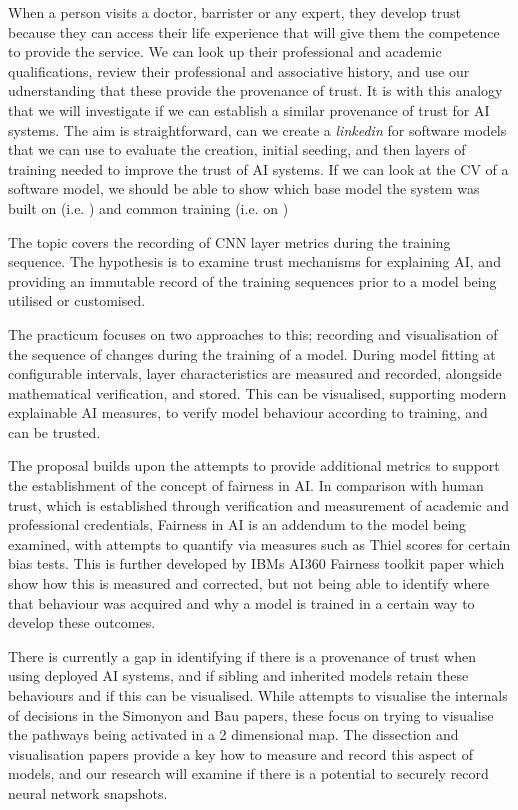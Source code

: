 When a person visits a doctor, barrister or any expert, they develop trust because they can access their life experience that will give them the competence to provide the service. We can look up their professional and academic qualifications, review their professional and associative history, and use our udnerstanding that these provide the provenance of trust. It is with this analogy that we will investigate if we can establish a similar provenance of trust for AI systems. The aim is straightforward, can we create a \textit{linkedin} for software models that we can use to evaluate the creation, initial seeding, and then layers of training needed to improve the trust of AI systems. If we can look at the CV of a software model, we should be able to show which base model the system was built on (i.e.  \cite{noauthor_151203385_nodate}) and common training (i.e. on \cite{deng_imagenet_2009})

The topic covers the recording of CNN layer metrics during the training
sequence. The hypothesis is to examine trust mechanisms for explaining AI, and
providing an immutable record of the training sequences prior to a model being
utilised or customised.

The practicum focuses on two approaches to this;
recording and visualisation of the sequence of changes during the training of a
model. During model fitting at configurable intervals, layer characteristics are
measured and recorded, alongside mathematical verification, and stored. This can
be visualised, supporting modern explainable AI measures, to verify model
behaviour according to training, and can be trusted.

The proposal builds upon the attempts to provide additional metrics to support
the establishment of the concept of fairness in AI. In comparison with human
trust, which is established through verification and measurement of academic and
professional credentials, Fairness in AI is an addendum to the model being
examined, with attempts to quantify via measures such as Thiel scores for
certain bias tests. This is further developed by IBMs AI360 Fairness toolkit
paper which show how this is measured and corrected, but not being able to
identify where that behaviour was acquired and why a model is trained in a
certain way to develop these outcomes.

There is currently a gap in identifying if there is a provenance of trust when using deployed AI systems, and if sibling
and inherited models retain these behaviours and if this can be visualised.
While attempts to visualise the internals of decisions in the Simonyon and Bau
papers, these focus on trying to visualise the pathways being activated in a 2
dimensional map. The dissection and visualisation papers provide a key how to
measure and record this aspect of models, and our research will examine if there
is a potential to securely record neural network snapshots.
 
